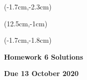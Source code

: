 \documentclass[12pt, oneside]{article}
\begin{document}
\begin{textblock*}{4cm}(-1.7cm,-2.3cm)
\end{textblock*}

\begin{textblock*}{8cm}(12.5cm,-1cm)
\end{textblock*}
\begin{textblock*}{13.5cm}(-1.7cm,-1.8cm)
\end{textblock*}

\vspace{1cm}

\begin{center}
\textbf{\Large Homework 6 Solutions}

\textbf{Due 13 October 2020}
\end{center}
\end{document}
